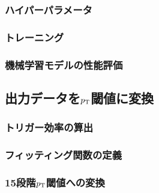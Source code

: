 \subsubsection{ハイパーパラメータ}

\subsubsection{トレーニング}

\subsubsection{機械学習モデルの性能評価}

\subsection{出力データを\texorpdfstring{$p_{\rm{T}}$}{TEXT}閾値に変換}
\subsubsection{トリガー効率の算出}

\subsubsection{フィッティング関数の定義}\label{section:fitting}

\subsubsection{15段階\texorpdfstring{$p_{\rm{T}}$}{TEXT}閾値への変換}